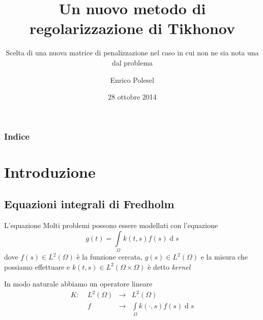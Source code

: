 \documentclass{beamer}
\theoremstyle{plain}
\theoremstyle{definition}
\theoremstyle{remark}
\newcommand{\intl}{\int \limits}
\DeclareMathOperator{\de}{d}
\begin{document}
\title[Un nuovo metodo di regolarizzazione di Tikhonov]{Un nuovo metodo di regolarizzazione di Tikhonov}
\subtitle{Scelta di una nuova matrice di penalizzazione nel caso in
  cui non ne sia nota una dal problema}
\author{Enrico Polesel}
\date{28 ottobre 2014}




\begin{frame}[plain]
  \titlepage
\end{frame}

\begin{frame}[plain]
 \frametitle{Indice}
 \tableofcontents
\end{frame}




\AtBeginSubsection[]
{
  \begin{frame}[plain]{\secname $\rightarrow$ \subsecname}
    \tableofcontents[currentsubsection]
  \end{frame}
}

\section{Introduzione}

\subsection{Equazioni integrali di Fredholm}

\begin{frame}{L'equazione}
  Molti problemi possono essere modellati con l'equazione
  \begin{equation*}
    g(t) = \intl _{\Omega} k(t,s) f(s) \de s
  \end{equation*}
  dove $f(s)\in L^2(\Omega)$ è la funzione cercata, $g(s)\in
  L^2(\Omega)$ e la misura che possiamo effettuare e $k(t,s)\in
  L^2(\Omega \times \Omega)$ è detto \textit{kernel}
  \vfill
  
  In modo naturale abbiamo un operatore lineare
  \[ \begin{matrix}
    K:\; &L^2(\Omega) &\longrightarrow &L^2(\Omega)\\
    & f &\longrightarrow & \intl _\Omega k(\cdot , s) f(s) \de s 
  \end{matrix} \]

\end{frame}
\end{document}

